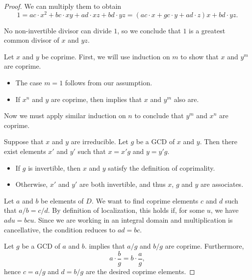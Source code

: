 \begin{proof}
  We can multiply them to obtain
  \begin{equation*}
    1 = ac \cdot x^2 + bc \cdot xy + ad \cdot xz + bd \cdot yz = (ac \cdot x + gc \cdot y + ad \cdot z) x + bd \cdot yz.
  \end{equation*}

  No non-invertible divisor can divide \( 1 \), so we conclude that \( 1 \) is a greatest common divisor of \( x \) and \( yz \).

   Let \( x \) and \( y \) be coprime. First, we will use induction on \( m \) to show that \( x \) and \( y^m \) are coprime.
  \begin{itemize}
    \item The case \( m = 1 \) follows from our assumption.
    \item If \( x^n \) and \( y \) are coprime, then  implies that \( x \) and \( y^m \) also are.
  \end{itemize}

  Now we must apply similar induction on \( n \) to conclude that \( y^m \) and \( x^n \) are coprime.

   Suppose that \( x \) and \( y \) are irreducible. Let \( g \) be a GCD of \( x \) and \( y \). Then there exist elements \( x' \) and \( y' \) such that \( x = x'g \) and \( y = y'g \).

  \begin{itemize}
    \item If \( g \) is invertible, then \( x \) and \( y \) satisfy the definition of coprimality.
    \item Otherwise, \( x' \) and \( y' \) are both invertible, and thus \( x \), \( g \) and \( y \) are associates.
  \end{itemize}

   Let \( a \) and \( b \) be elements of \( D \). We want to find coprime elements \( c \) and \( d \) such that \( a / b = c / d \). By definition of localization, this holds if, for some \( u \), we have \( adu = bcu \). Since we are working in an integral domain and multiplication is cancellative, the condition reduces to \( ad = bc \).

  Let \( g \) be a GCD of \( a \) and \( b \).  implies that \( a / g \) and \( b / g \) are coprime. Furthermore,
  \begin{equation*}
    a \cdot \frac b g = b \cdot \frac a g,
  \end{equation*}
  hence \( c = a / g \) and \( d = b / g \) are the desired coprime elements.
\end{proof}

